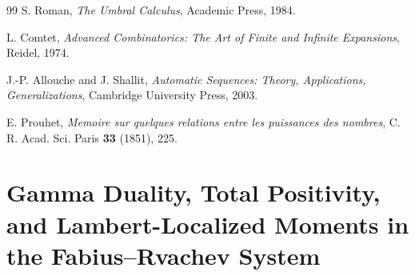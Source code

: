 \documentclass[11pt]{article}
\makeatletter
\renewcommand{\headrulewidth}{0.3pt}
\numberwithin{equation}{section}
\let\frontier@normal@H@refstepcounter\H@refstepcounter
\let\frontier@normal@Hy@chapapp\Hy@chapapp
\newcommand{\frontierreportpart}[1]{%
  \clearpage
  \let\H@refstepcounter\frontier@normal@H@refstepcounter
  \let\Hy@chapapp\frontier@normal@Hy@chapapp
  \gdef\theHsection{\arabic{part}.\arabic{section}}%
  \setcounter{section}{0}%
  \renewcommand{\thesection}{\arabic{section}}%
  \part{#1}}
\theoremstyle{definition}
\theoremstyle{remark}
\makeatother
\begin{document}
\begin{thebibliography}{99}
S. Roman,
\emph{The Umbral Calculus},
Academic Press, 1984.

L. Comtet,
\emph{Advanced Combinatorics: The Art of Finite and Infinite Expansions},
Reidel, 1974.

J.-P. Allouche and J. Shallit,
\emph{Automatic Sequences: Theory, Applications, Generalizations},
Cambridge University Press, 2003.

E. Prouhet,
\emph{Memoire sur quelques relations entre les puissances des nombres},
C. R. Acad. Sci. Paris \textbf{33} (1851), 225.

\end{thebibliography}


\renewcommand{\headrulewidth}{0.4pt}
\newcommand{\VarPartii}{\operatorname{Var}}
\newcommand{\CovPartii}{\operatorname{Cov}}
\newcommand{\suppPartii}{\operatorname{supp}}
\newcommand{\sgnPartii}{\operatorname{sgn}}
\newcommand{\vtwoPartii}{v_2}
\newcommand{\diagPartii}{\operatorname{diag}}
\newcommand{\Law}{\operatorname{Law}}
\newcommand{\Cum}{\operatorname{Cum}}
\newcommand{\dist}{\mathrel{\stackrel{\mathrm d}=}}
\newcommand{\repoPartii}{\nolinkurl{Analysis/FabiusFunction}}
\newcommand{\statusproved}{\textcolor{provedgreen}{\textbf{proved here}}}
\newcommand{\statusfrontier}{\textcolor{cautionorange}{\textbf{frontier proposal}}}

\frontierreportpart{Gamma Duality, Total Positivity, and Lambert-Localized
Moments in the Fabius--Rvachev System}
\end{document}
